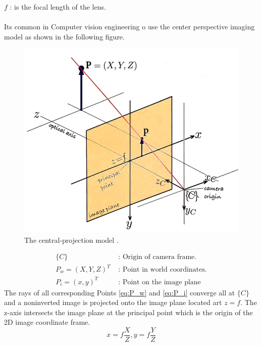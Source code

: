 \documentclass[journal,final,a4paper,twoside]{PS}
\begin{document}
$f$ : is the focal length of the lens.
\\
\\
Its common in Computer vision engineering o use the center perspective imaging model  as shown in the following figure.
\\
\begin{figure}[h]
\begin{center}
\includegraphics[scale=0.6]{./pics/CenterProjectionModel.png}
\caption{The central-projection model \cite{Corke}.}
\label{fig:projectionModel}
\end{center}
\end{figure}
\begin{subequations}
\begin{align}
\{C\}&\text{ : Origin of camera frame.}\label{eq:C_origin}\\
P_w=(X,Y,Z)^T&\text{ : Point in world coordinates.}\label{eq:P_w}\\
P_i=(x,y)^T&\text{ : Point on the image plane}\label{eq:P_i}
\end{align}
\end{subequations}
The rays of all corresponding Points \ref{eq:P_w} and \ref{eq:P_i} converge all at $\{C\}$ and a noninverted image is projected onto the image plane located art $z=f$. The z-axis intersects the image plane at the principal point which is the origin of the 2D image coordinate frame.
\begin{equation}
x=f\frac{X}{Z}, y=f\frac{Y}{Z}
\end{equation}
\end{document}
